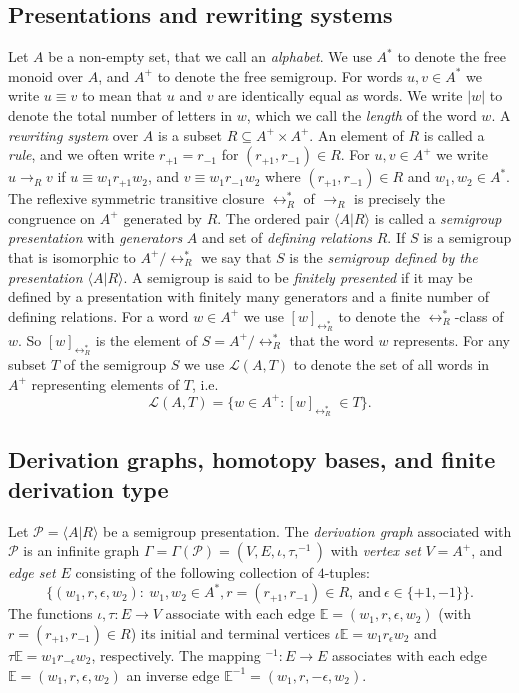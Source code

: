 \documentclass[11pt]{amsart}
\theoremstyle{plain}
\begin{document}
\subsection*{Presentations and rewriting systems}

Let $A$ be a non-empty set, that we call an \emph{alphabet}. We use $A^*$ to denote the free monoid over $A$, and $A^+$ to denote the free semigroup. For words $u,v \in A^*$ we write $u \equiv v$ to mean that $u$ and $v$ are identically equal as words. We write $|w|$ to denote the total number of letters in $w$, which we call the \emph{length} of the word $w$. A \emph{rewriting system} over $A$ is a subset $R \subseteq A^+ \times A^+$. An element of $R$ is called a \emph{rule}, and we often write $r_{+1}=r_{-1}$ for $(r_{+1}, r_{-1}) \in R$. For $u, v \in A^+$ we write $u \rightarrow_R v$ if $u \equiv w_1 r_{+1} w_2$, and $v \equiv w_1 r_{-1} w_2$ where $(r_{+1},r_{-1}) \in R$ and $w_1, w_2 \in A^*$. The reflexive symmetric transitive closure $\leftrightarrow_R^{*}$ of $\rightarrow_R$ is precisely the congruence on $A^+$ generated by $R$. The ordered pair $\langle A | R \rangle$ is called a \emph{semigroup presentation} with \emph{generators} $A$ and set of \emph{defining relations} $R$. If $S$ is a semigroup that is isomorphic to $A^+  / \leftrightarrow_R^{*}$ we say that $S$ is the \emph{semigroup defined by the presentation ${\langle} A | R {\rangle}$}. A semigroup is said to be \emph{finitely presented} if it may be defined by a presentation with finitely many generators and a finite number of defining relations. For a word $w \in A^+$ we use $[w]_{\leftrightarrow_R^{*}}$ to denote the $\leftrightarrow_R^{*}$-class of $w$. So $[w]_{\leftrightarrow_R^{*}}$ is the element of $S = A^+ / \leftrightarrow_R^{*}$ that the word $w$ represents. For any subset $T$ of the semigroup $S$ we use ${\mathcal{L}({A,T})}$ to denote the set of all words in $A^+$ representing elements of $T$, i.e.
$$
{\mathcal{L}({A,T})} = \{ w \in A^+ : [w]_{\leftrightarrow_R^{*}}\; \in T \}.
$$

\subsection*{Derivation graphs, homotopy bases, and finite derivation type}

Let $\mathcal{P} = {\langle} A | R {\rangle}$ be a semigroup presentation. The \emph{derivation graph} associated with ${\mathcal{P}}$ is an infinite graph $\Gamma = \Gamma({\mathcal{P}}) = (V,E,\iota, \tau, ^{-1})$ with \emph{vertex set} $V = A^+$, and \emph{edge set $E$} consisting of the following collection of $4$-tuples:
\[
\{ (w_1, r, \epsilon, w_2): \ w_1, w_2 \in A^*, r=(r_{+1},r_{-1}) \in R, \ \mbox{and} \ \epsilon \in \{ +1, -1 \} \}.
\]
The functions $\iota, \tau : E \rightarrow V$ associate with each edge ${\mathbb{E}} = (w_1, r, \epsilon, w_2)$ (with $r=(r_{+1},r_{-1}) \in R$) its initial and terminal vertices $\iota {\mathbb{E}} = w_1 r_{\epsilon} w_2$ and $\tau {\mathbb{E}} = w_1 r_{- \epsilon} w_2$, respectively. The mapping $^{-1} : E \rightarrow E$ associates with each edge ${\mathbb{E}} = (w_1, r, \epsilon, w_2)$ an inverse edge ${\mathbb{E}}^{-1} = (w_1, r, -\epsilon, w_2)$.
\end{document}
